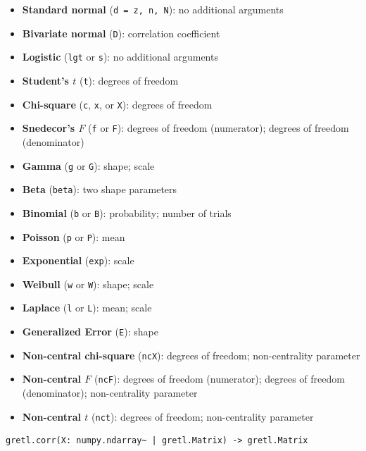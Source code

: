 \begin{footnotesize}\begin{itemize}
	\item \textbf{Standard normal} (\texttt{d = z, n, N}): no additional arguments
	\item \textbf{Bivariate normal} (\texttt{D}): correlation coefficient
	\item \textbf{Logistic} (\texttt{lgt} or \texttt{s}): no additional arguments
	\item \textbf{Student's $t$} (\texttt{t}): degrees of freedom
	\item \textbf{Chi-square} (\texttt{c}, \texttt{x}, or \texttt{X}): degrees of freedom
	\item \textbf{Snedecor's $F$} (\texttt{f} or \texttt{F}): degrees of freedom (numerator); degrees of freedom (denominator)
	\item \textbf{Gamma} (\texttt{g} or \texttt{G}): shape; scale
	\item \textbf{Beta} (\texttt{beta}): two shape parameters
	\item \textbf{Binomial} (\texttt{b} or \texttt{B}): probability; number of trials
	\item \textbf{Poisson} (\texttt{p} or \texttt{P}): mean
	\item \textbf{Exponential} (\texttt{exp}): scale
	\item \textbf{Weibull} (\texttt{w} or \texttt{W}): shape; scale
	\item \textbf{Laplace} (\texttt{l} or \texttt{L}): mean; scale
	\item \textbf{Generalized Error} (\texttt{E}): shape
	\item \textbf{Non-central chi-square} (\texttt{ncX}): degrees of freedom; non-centrality parameter
	\item \textbf{Non-central $F$} (\texttt{ncF}): degrees of freedom (numerator); degrees of freedom (denominator); non-centrality parameter
	\item \textbf{Non-central $t$} (\texttt{nct}): degrees of freedom; non-centrality parameter
\end{itemize}\end{footnotesize}

\label{func:gretl.corr}
\begin{lstlisting}[style=pythonstylefoot]
gretl.corr(X: numpy.ndarray~ | gretl.Matrix) -> gretl.Matrix
\end{lstlisting}

